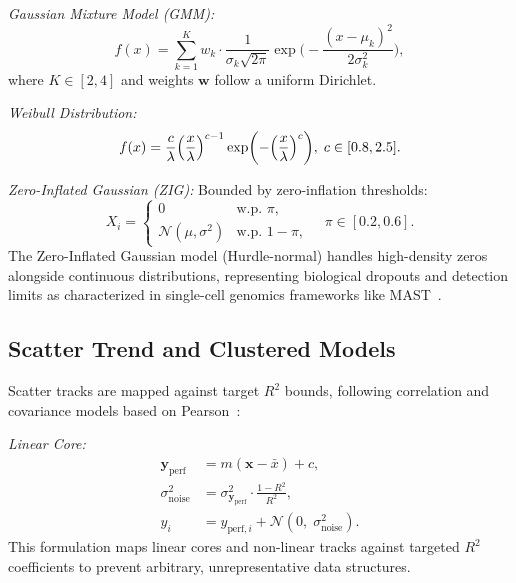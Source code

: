 \documentclass[11pt,twocolumn]{article}
\newcommand{\N}{\mathcal{N}}
\begin{document}
\noindent\emph{Gaussian Mixture Model (GMM):}
\begin{equation}\label{eq:gmm}
  f(x) = \sum_{k=1}^K w_k \cdot \frac{1}{\sigma_k\sqrt{2\pi}}\exp\biggl(-\frac{(x-\mu_k)^2}{2\sigma_k^2}\biggr),
\end{equation}
where $K \in [2,4]$ and weights $\mathbf{w}$ follow a uniform Dirichlet.

\noindent\emph{Weibull Distribution:}
\begin{equation}\label{eq:weibull}
  f(x) = \frac{c}{\lambda}\Bigl(\frac{x}{\lambda}\Bigr)^{c-1}\exp\biggl(-\Bigl(\frac{x}{\lambda}\Bigr)^c\biggr),\; c \in [0.8, 2.5].
\end{equation}

\noindent\emph{Zero-Inflated Gaussian (ZIG):} Bounded by zero-inflation thresholds:
\begin{equation}\label{eq:zig}
  X_i = \begin{cases}
    0 & \text{w.p. } \pi,\\
    \N(\mu,\sigma^2) & \text{w.p. } 1-\pi,
  \end{cases}\quad \pi \in [0.2, 0.6].
\end{equation}
The Zero-Inflated Gaussian model (Hurdle-normal) handles high-density zeros alongside continuous distributions, representing biological dropouts and detection limits as characterized in single-cell genomics frameworks like MAST~\cite{finak2015mast}.

\subsection{Scatter Trend and Clustered Models}\label{sec:scatter}

Scatter tracks are mapped against target $R^2$ bounds, following correlation and covariance models based on Pearson~\cite{pearson1897mathematical}:

\noindent\emph{Linear Core:}
\begin{align}
  \mathbf{y}_{\text{perf}} &= m(\mathbf{x}-\bar{x}) + c, \label{eq:scatter_linear}\\
  \sigma_{\text{noise}}^2 &= \sigma_{\mathbf{y}_{\text{perf}}}^2 \cdot \frac{1-R^2}{R^2}, \label{eq:scatter_noise}\\
  y_i &= y_{\text{perf},i} + \N(0,\;\sigma_{\text{noise}}^2). \label{eq:scatter_final}
\end{align}
This formulation maps linear cores and non-linear tracks against targeted $R^2$ coefficients to prevent arbitrary, unrepresentative data structures.
\end{document}
